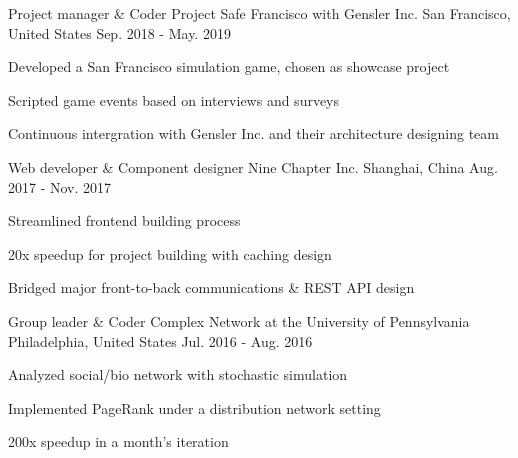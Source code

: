 \begin{cventries}
  \cventry
    {Project manager \& Coder}
    {Project Safe Francisco with Gensler Inc.}
    {San Francisco, United States}
    {Sep. 2018 - May. 2019}
    {
      \begin{cvitems}
        \item {Developed a San Francisco simulation game, chosen as showcase project}
        \item {Scripted game events based on interviews and surveys}
        \item {Continuous intergration with Gensler Inc. and their architecture designing team}
      \end{cvitems}
    }

  \cventry
    {Web developer \& Component designer}
    {Nine Chapter Inc.}
    {Shanghai, China}
    {Aug. 2017 - Nov. 2017}
    {
      \begin{cvitems}
        \item {Streamlined frontend building process}
        \item {20x speedup for project building with caching design}
        \item {Bridged major front-to-back communications \& REST API design}
      \end{cvitems}
    }

  \cventry
    {Group leader \& Coder}
    {Complex Network at the University of Pennsylvania}
    {Philadelphia, United States}
    {Jul. 2016 - Aug. 2016}
    {
      \begin{cvitems}
        \item {Analyzed social/bio network with stochastic simulation}
        \item {Implemented PageRank under a distribution network setting}
        \item {200x speedup in a month's iteration}
      \end{cvitems}
    }

\end{cventries}
